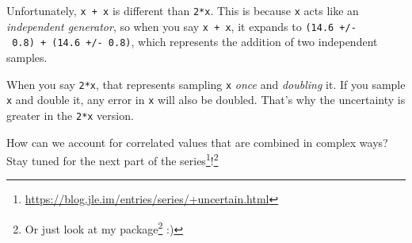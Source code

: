 \documentclass[]{article}
\renewcommand{\href}[2]{#2\footnote{\url{#1}}}
\begin{document}
Unfortunately, \texttt{x\ +\ x} is different than \texttt{2*x}. This is because
\texttt{x} acts like an \emph{independent generator}, so when you say
\texttt{x\ +\ x}, it expands to \texttt{(14.6\ +/-\ 0.8)\ +\ (14.6\ +/-\ 0.8)},
which represents the addition of two independent samples.

When you say \texttt{2*x}, that represents sampling \texttt{x} \emph{once} and
\emph{doubling} it. If you sample \texttt{x} and double it, any error in
\texttt{x} will also be doubled. That's why the uncertainty is greater in the
\texttt{2*x} version.

How can we account for correlated values that are combined in complex ways? Stay
tuned for the next part of the
\href{https://blog.jle.im/entries/series/+uncertain.html}{series}!\footnote{Or
  just look at my \href{https://hackage.haskell.org/package/uncertain}{package}
  :)}
\end{document}
